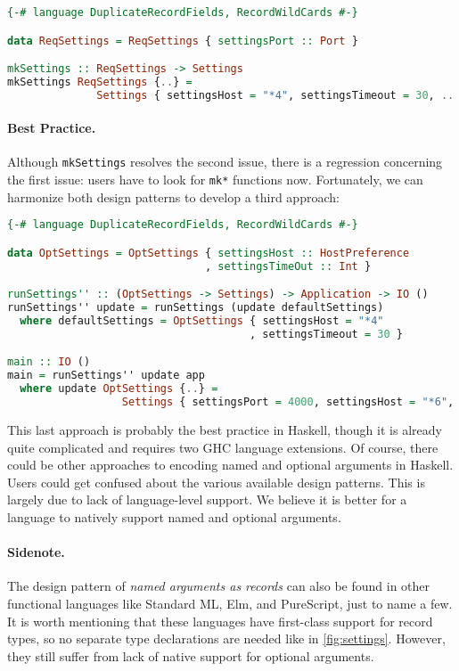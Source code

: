 \begin{lstlisting}[language=Haskell]
{-# language DuplicateRecordFields, RecordWildCards #-}

data ReqSettings = ReqSettings { settingsPort :: Port }

mkSettings :: ReqSettings -> Settings
mkSettings ReqSettings {..} =
              Settings { settingsHost = "*4", settingsTimeout = 30, .. }
\end{lstlisting}

\paragraph{Best Practice.}
Although \lstinline{mkSettings} resolves the second issue, there is a regression
concerning the first issue: users have to look for \lstinline{mk*} functions
now. Fortunately, we can harmonize both design patterns to develop a third
approach:

\begin{lstlisting}[language=Haskell]
{-# language DuplicateRecordFields, RecordWildCards #-}

data OptSettings = OptSettings { settingsHost :: HostPreference
                               , settingsTimeOut :: Int }

runSettings'' :: (OptSettings -> Settings) -> Application -> IO ()
runSettings'' update = runSettings (update defaultSettings)
  where defaultSettings = OptSettings { settingsHost = "*4"
                                      , settingsTimeout = 30 }

main :: IO ()
main = runSettings'' update app
  where update OptSettings {..} =
                  Settings { settingsPort = 4000, settingsHost = "*6", .. }
\end{lstlisting}

\noindent This last approach is probably the best practice in Haskell, though it
is already quite complicated and requires two GHC language extensions. Of
course, there could be other approaches to encoding named and optional arguments
in Haskell. Users could get confused about the various available design
patterns. This is largely due to lack of language-level support. We believe it
is better for a language to natively support named and optional arguments.

\paragraph{Sidenote.}
The design pattern of \emph{named arguments as records} can also be found in
other functional languages like Standard ML, Elm, and PureScript, just to name a
few. It is worth mentioning that these languages have first-class support for
record types, so no separate type declarations are needed like in
\autoref{fig:settings}. However, they still suffer from lack of native support
for optional arguments.

